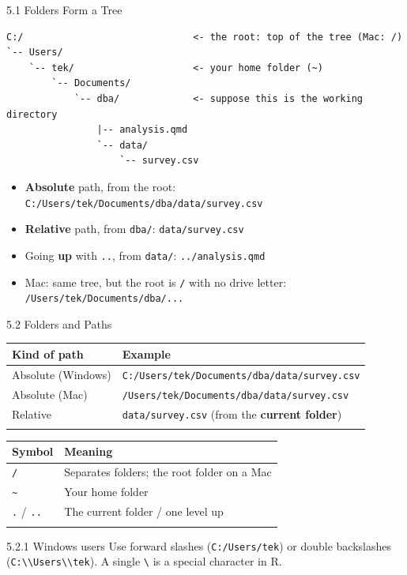 \documentclass[
  ignorenonframetext,
  aspectratio=169,
]{beamer}
\newcounter{none} %
\providecommand{\tightlist}{%
  \setlength{\itemsep}{0pt}\setlength{\parskip}{0pt}}
\begin{document}
\begin{frame}[fragile]{5.1 Folders Form a Tree}
\protect{}\label{folders-form-a-tree}
\begin{verbatim}
C:/                              <- the root: top of the tree (Mac: /)
`-- Users/
    `-- tek/                     <- your home folder (~)
        `-- Documents/
            `-- dba/             <- suppose this is the working directory
                |-- analysis.qmd
                `-- data/
                    `-- survey.csv
\end{verbatim}

\begin{itemize}
\tightlist
\item
  \textbf{Absolute} path, from the root:
  \texttt{C:/Users/tek/Documents/dba/data/survey.csv}
\item
  \textbf{Relative} path, from \texttt{dba/}: \texttt{data/survey.csv}
\item
  Going \textbf{up} with \texttt{..}, from \texttt{data/}:
  \texttt{../analysis.qmd}
\item
  Mac: same tree, but the root is \texttt{/} with no drive letter:
  \texttt{/Users/tek/Documents/dba/...}
\end{itemize}
\end{frame}

\begin{frame}[fragile]{5.2 Folders and Paths}
\protect{}\label{folders-and-paths}
{\def\LTcaptype{none} %
\begin{longtable}[]{@{}ll@{}}
\toprule\noalign{}
Kind of path & Example \\
\midrule\noalign{}
\endhead
Absolute (Windows) &
\texttt{C:/Users/tek/Documents/dba/data/survey.csv} \\
Absolute (Mac) & \texttt{/Users/tek/Documents/dba/data/survey.csv} \\
Relative & \texttt{data/survey.csv} (from the \textbf{current
folder}) \\
\bottomrule\noalign{}
\end{longtable}
}

{\def\LTcaptype{none} %
\begin{longtable}[]{@{}ll@{}}
\toprule\noalign{}
Symbol & Meaning \\
\midrule\noalign{}
\endhead
\texttt{/} & Separates folders; the root folder on a Mac \\
\texttt{\textasciitilde{}} & Your home folder \\
\texttt{.} / \texttt{..} & The current folder / one level up \\
\bottomrule\noalign{}
\end{longtable}
}

\begin{alertblock}{5.2.1 Windows users}
\protect{}\label{windows-users}
Use forward slashes (\texttt{C:/Users/tek}) or double backslashes
(\texttt{C:\textbackslash{}\textbackslash{}Users\textbackslash{}\textbackslash{}tek}).
A single \texttt{\textbackslash{}} is a special character in R.
\end{alertblock}
\end{frame}
\end{document}
